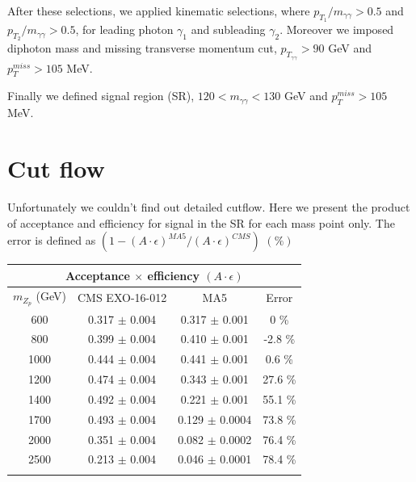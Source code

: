 \documentclass[12pt,A4paper]{article}
\begin{document}
After these selections, we applied kinematic selections, where $p_{T_1}/m_{\gamma\gamma} > 0.5$ and $p_{T_2}/m_{\gamma\gamma} > 0.5$, for leading photon $\gamma_1$ and subleading $\gamma_2$. Moreover we imposed diphoton mass and missing transverse momentum cut, $p_{T_{\gamma\gamma}} > 90$ GeV and $p_T^{miss} > 105$ MeV.

Finally we defined signal region (SR), $120 < m_{\gamma\gamma} < 130$ GeV and $p_T^{miss} > 105$ MeV.


\section{Cut flow}
 Unfortunately we couldn't find out detailed cutflow. Here we present the product of acceptance and efficiency for signal in the SR for each mass point only. The error is defined as $(1-(A\cdot\epsilon)^{MA5}/(A\cdot\epsilon)^{CMS})$ $(\%)$
\vskip 10pt

\begin{center}
\begin{tabular}{c c c c}
\hline
\multicolumn{4}{c}{Acceptance $\times$ efficiency $(A \cdot \epsilon)$}\\
\hline
$m_{Z_p}$ (GeV)& CMS EXO-16-012& MA5& Error\\
\hline
600& 0.317 $\pm$ 0.004& 0.317 $\pm$ 0.001& 0 \%\\
800& 0.399 $\pm$ 0.004& 0.410 $\pm$ 0.001& -2.8 \%\\
1000& 0.444 $\pm$ 0.004& 0.441 $\pm$ 0.001& 0.6 \%\\
1200& 0.474 $\pm$ 0.004& 0.343 $\pm$ 0.001& 27.6 \%\\
1400& 0.492 $\pm$ 0.004& 0.221  $\pm$ 0.001& 55.1 \%\\
1700& 0.493 $\pm$ 0.004& 0.129 $\pm$ 0.0004& 73.8 \%\\
2000& 0.351 $\pm$ 0.004& 0.082 $\pm$ 0.0002& 76.4 \%\\
2500& 0.213 $\pm$ 0.004& 0.046 $\pm$ 0.0001& 78.4 \%\\
\hline
\vspace*{20pt}
\end{tabular}
\end{center}
\end{document}
